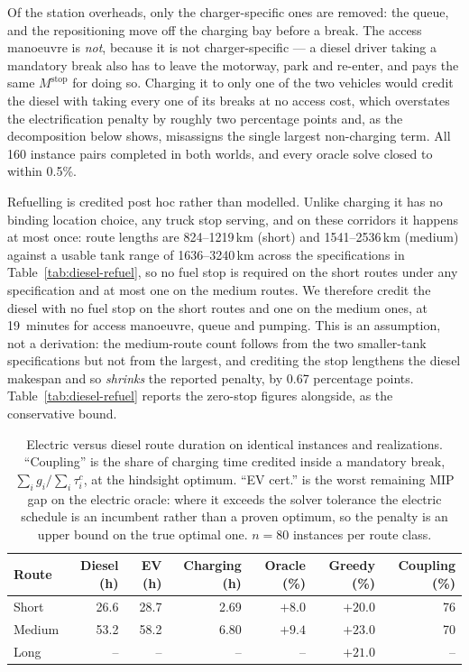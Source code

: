 Of the station overheads, only the charger-specific ones are removed: the
queue, and the repositioning move off the charging bay before a break.  The
access manoeuvre is \emph{not}, because it is not charger-specific --- a diesel
driver taking a mandatory break also has to leave the motorway, park and
re-enter, and pays the same $M^{\text{stop}}$ for doing so.  Charging it to
only one of the two vehicles would credit the diesel with taking every one of
its breaks at no access cost, which overstates the electrification penalty by
roughly two percentage points and, as the decomposition below shows, misassigns
the single largest non-charging term.  All 160 instance pairs completed in both
worlds, and every oracle solve closed to within 0.5\%.

Refuelling is credited post hoc rather than modelled.  Unlike charging it has
no binding location choice, any truck stop serving, and on these corridors it
happens at most once: route lengths are 824--1219\,km (short) and
1541--2536\,km (medium) against a usable tank range of 1636--3240\,km across
the specifications in Table~\ref{tab:diesel-refuel}, so no fuel stop is
required on the short routes under any specification and at most one on the
medium routes.  We therefore credit the diesel with no fuel stop on the short
routes and one on the medium ones, at 19~minutes for access manoeuvre, queue
and pumping.  This is an assumption, not a derivation: the medium-route count
follows from the two smaller-tank specifications but not from the largest, and
crediting the stop lengthens the diesel makespan and so \emph{shrinks} the
reported penalty, by 0.67 percentage points.  Table~\ref{tab:diesel-refuel}
reports the zero-stop figures alongside, as the conservative bound.

\begin{table}[htbp]
\centering
\caption{Electric versus diesel route duration on identical instances and
realizations.  ``Coupling'' is the share of charging time credited inside a
mandatory break, $\sum_i g_i / \sum_i \tau^c_i$, at the hindsight optimum.
``EV cert.'' is the worst remaining MIP gap on the electric oracle: where it
exceeds the solver tolerance the electric schedule is an incumbent rather than
a proven optimum, so the penalty is an upper bound on the true optimal one.
$n = 80$ instances per route class.}
\label{tab:diesel}
\begin{tabular}{lrrrrrr}
\toprule
\textbf{Route} & \textbf{Diesel (h)} & \textbf{EV (h)} & \textbf{Charging (h)}
 & \textbf{Oracle (\%)} & \textbf{Greedy (\%)} & \textbf{Coupling (\%)} \\
\midrule
Short  & 26.6 & 28.7 & 2.69 & $+8.0$ & $+20.0$ & 76 \\
Medium & 53.2 & 58.2 & 6.80 & $+9.4$ & $+23.0$ & 70 \\
Long   & --   & --   & --   & --     & $+21.0$ & -- \\
\bottomrule
\end{tabular}
\end{table}

